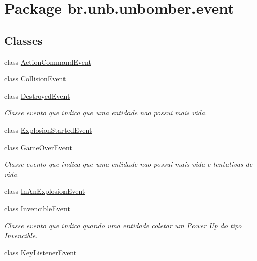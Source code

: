 \hypertarget{namespacebr_1_1unb_1_1unbomber_1_1event}{\section{Package br.\+unb.\+unbomber.\+event}
\label{namespacebr_1_1unb_1_1unbomber_1_1event}
}
\subsection*{Classes}
\begin{DoxyCompactItemize}
\item 
class \hyperlink{classbr_1_1unb_1_1unbomber_1_1event_1_1_action_command_event}{Action\+Command\+Event}
\item 
class \hyperlink{classbr_1_1unb_1_1unbomber_1_1event_1_1_collision_event}{Collision\+Event}
\item 
class \hyperlink{classbr_1_1unb_1_1unbomber_1_1event_1_1_destroyed_event}{Destroyed\+Event}
\begin{DoxyCompactList}\small\item\em Classe evento que indica que uma entidade nao possui mais vida. \end{DoxyCompactList}\item 
class \hyperlink{classbr_1_1unb_1_1unbomber_1_1event_1_1_explosion_started_event}{Explosion\+Started\+Event}
\item 
class \hyperlink{classbr_1_1unb_1_1unbomber_1_1event_1_1_game_over_event}{Game\+Over\+Event}
\begin{DoxyCompactList}\small\item\em Classe evento que indica que uma entidade nao possui mais vida e tentativas de vida. \end{DoxyCompactList}\item 
class \hyperlink{classbr_1_1unb_1_1unbomber_1_1event_1_1_in_an_explosion_event}{In\+An\+Explosion\+Event}
\item 
class \hyperlink{classbr_1_1unb_1_1unbomber_1_1event_1_1_invencible_event}{Invencible\+Event}
\begin{DoxyCompactList}\small\item\em Classe evento que indica quando uma entidade coletar um Power Up do tipo Invencible. \end{DoxyCompactList}\item 
class \hyperlink{classbr_1_1unb_1_1unbomber_1_1event_1_1_key_listener_event}{Key\+Listener\+Event}
\item 

\end{DoxyCompactItemize}
